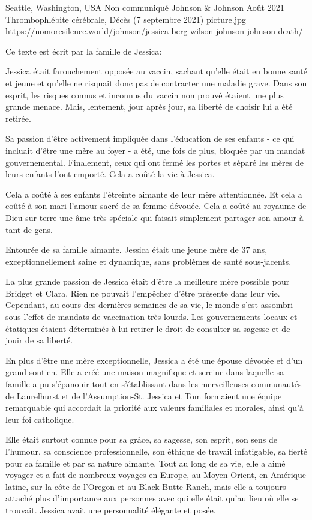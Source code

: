 {Seattle, Washington, USA}
{Non communiqué}
{Johnson \& Johnson}
{Août 2021}
{Thrombophlébite cérébrale, Décès (7 septembre 2021)}
{picture.jpg}
{https://nomoresilence.world/johnson/jessica-berg-wilson-johnson-johnson-death/}
{

Ce texte est écrit par la famille de Jessica:

Jessica était farouchement opposée au vaccin, sachant qu'elle était en bonne
santé et jeune et qu'elle ne risquait donc pas de contracter une maladie
grave. Dans son esprit, les risques connus et inconnus du vaccin non prouvé
étaient une plus grande menace. Mais, lentement, jour après jour, sa liberté de
choisir lui a été retirée.

Sa passion d'être activement impliquée dans l'éducation de ses enfants - ce qui
incluait d'être une mère au foyer - a été, une fois de plus, bloquée par un
mandat gouvernemental. Finalement, ceux qui ont fermé les portes et séparé les
mères de leurs enfants l'ont emporté. Cela a coûté la vie à Jessica.

Cela a coûté à ses enfants l'étreinte aimante de leur mère attentionnée. Et cela
a coûté à son mari l'amour sacré de sa femme dévouée. Cela a coûté au royaume de
Dieu sur terre une âme très spéciale qui faisait simplement partager son amour à
tant de gens.

Entourée de sa famille aimante. Jessica était une jeune mère de 37 ans,
exceptionnellement saine et dynamique, sans problèmes de santé sous-jacents.

La plus grande passion de Jessica était d'être la meilleure mère possible pour
Bridget et Clara. Rien ne pouvait l'empêcher d'être présente dans leur
vie. Cependant, au cours des dernières semaines de sa vie, le monde s'est
assombri sous l'effet de mandats de vaccination très lourds. Les gouvernements
locaux et étatiques étaient déterminés à lui retirer le droit de consulter sa
sagesse et de jouir de sa liberté.

En plus d'être une mère exceptionnelle, Jessica a été une épouse dévouée et d'un
grand soutien. Elle a créé une maison magnifique et sereine dans laquelle sa
famille a pu s'épanouir tout en s'établissant dans les merveilleuses communautés
de Laurelhurst et de l'Assumption-St. Jessica et Tom formaient une équipe
remarquable qui accordait la priorité aux valeurs familiales et morales, ainsi
qu'à leur foi catholique.

Elle était surtout connue pour sa grâce, sa sagesse, son esprit, son sens de
l'humour, sa conscience professionnelle, son éthique de travail infatigable, sa
fierté pour sa famille et par sa nature aimante. Tout au long de sa vie, elle a
aimé voyager et a fait de nombreux voyages en Europe, au Moyen-Orient, en
Amérique latine, sur la côte de l'Oregon et au Black Butte Ranch, mais elle a
toujours attaché plus d'importance aux personnes avec qui elle était qu'au lieu
où elle se trouvait. Jessica avait une personnalité élégante et posée.

}
